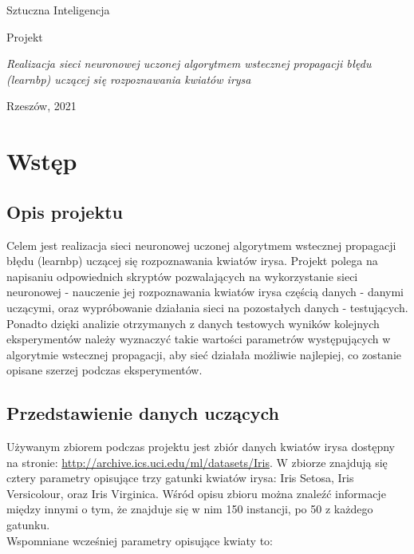 \documentclass[a4paper, 12pt]{report}
\begin{document}
\begin{titlepage}
\begin{center}
\huge {Sztuczna Inteligencja}

\vspace{6cm}

\huge  Projekt

\vspace{2cm}

\Large \textit{Realizacja sieci neuronowej uczonej algorytmem wstecznej propagacji błędu (learnbp) uczącej się rozpoznawania kwiatów irysa }

\vspace{8cm}

\large {}
\large {}

\vspace{3cm}
Rzeszów, 2021

\end{center}
\end{titlepage}

\tableofcontents{}
\pagebreak

\chapter{Wstęp}
\section {Opis projektu}
Celem jest realizacja sieci neuronowej uczonej algorytmem wstecznej propagacji błędu (learnbp) uczącej się rozpoznawania kwiatów irysa. Projekt polega na napisaniu odpowiednich skryptów pozwalających na wykorzystanie sieci neuronowej - nauczenie jej rozpoznawania kwiatów irysa częścią danych - danymi uczącymi, oraz wypróbowanie działania sieci na pozostałych danych - testujących. Ponadto dzięki analizie otrzymanych z danych testowych wyników kolejnych eksperymentów należy wyznaczyć takie wartości parametrów występujących w algorytmie wstecznej propagacji, aby sieć działała możliwie najlepiej, co zostanie opisane szerzej podczas eksperymentów.

\section {Przedstawienie danych uczących}
Używanym zbiorem podczas projektu jest zbiór danych kwiatów irysa dostępny na stronie: \url {http://archive.ics.uci.edu/ml/datasets/Iris}. W zbiorze znajdują się cztery parametry opisujące trzy gatunki kwiatów irysa: Iris Setosa, Iris Versicolour, oraz Iris Virginica. Wśród opisu zbioru można znaleźć informacje między innymi o tym, że znajduje się w nim 150 instancji, po 50 z każdego gatunku. \\ Wspomniane wcześniej parametry opisujące kwiaty to:
\end{document}
